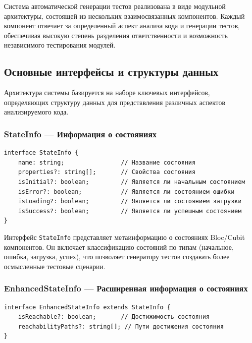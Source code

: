 \documentclass[14pt, russian]{scrartcl}
\begin{document}
Система автоматической генерации тестов реализована в виде модульной архитектуры, состоящей из нескольких взаимосвязанных компонентов. Каждый компонент отвечает за определенный аспект анализа кода и генерации тестов, обеспечивая высокую степень разделения ответственности и возможность независимого тестирования модулей.

\subsection{Основные интерфейсы и структуры данных}

Архитектура системы базируется на наборе ключевых интерфейсов, определяющих структуру данных для представления различных аспектов анализируемого кода.

\subsubsection{StateInfo — Информация о состояниях}

\begin{verbatim}
interface StateInfo {
    name: string;                // Название состояния
    properties?: string[];       // Свойства состояния
    isInitial?: boolean;         // Является ли начальным состоянием
    isError?: boolean;           // Является ли состоянием ошибки
    isLoading?: boolean;         // Является ли состоянием загрузки
    isSuccess?: boolean;         // Является ли успешным состоянием
}
\end{verbatim}

Интерфейс \texttt{StateInfo} представляет метаинформацию о состояниях Bloc/Cubit компонентов. Он включает классификацию состояний по типам (начальное, ошибка, загрузка, успех), что позволяет генератору тестов создавать более осмысленные тестовые сценарии.

\subsubsection{EnhancedStateInfo — Расширенная информация о состояниях}

\begin{verbatim}
interface EnhancedStateInfo extends StateInfo {
    isReachable?: boolean;       // Достижимость состояния
    reachabilityPaths?: string[]; // Пути достижения состояния
}
\end{verbatim}
\end{document}
